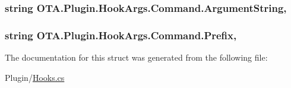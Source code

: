 \subsubsection[{Argument\+String}]{\setlength{\rightskip}{0pt plus 5cm}string O\+T\+A.\+Plugin.\+Hook\+Args.\+Command.\+Argument\+String\hspace{0.3cm}{\ttfamily [get]}, {\ttfamily [set]}}\label{struct_o_t_a_1_1_plugin_1_1_hook_args_1_1_command_ac7a67cf17520394b2dd4faea387fe55f}
\hypertarget{struct_o_t_a_1_1_plugin_1_1_hook_args_1_1_command_a445a364f6d5e4c28a620abf4485392ec}{}
\subsubsection[{Prefix}]{\setlength{\rightskip}{0pt plus 5cm}string O\+T\+A.\+Plugin.\+Hook\+Args.\+Command.\+Prefix\hspace{0.3cm}{\ttfamily [get]}, {\ttfamily [set]}}\label{struct_o_t_a_1_1_plugin_1_1_hook_args_1_1_command_a445a364f6d5e4c28a620abf4485392ec}


The documentation for this struct was generated from the following file\+:\begin{DoxyCompactItemize}
\item 
Plugin/\hyperlink{_hooks_8cs}{Hooks.\+cs}\end{DoxyCompactItemize}
